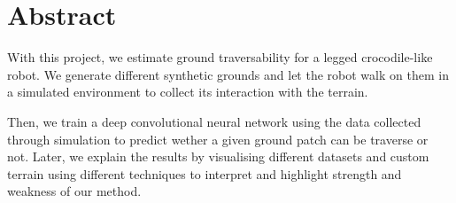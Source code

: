 \documentclass[../document.tex]{subfiles}
\begin{document}
\section{Abstract}
With this project, we estimate ground traversability for a legged crocodile-like robot. We generate different synthetic grounds and let the robot walk on them in a simulated environment to collect its interaction with the terrain.  

Then, we train a deep convolutional neural network using the data collected through simulation to predict wether a given ground patch can be traverse or not. Later, we explain the results by visualising different datasets and custom terrain using different techniques to interpret and highlight strength and weakness of our method.

\end{document}
